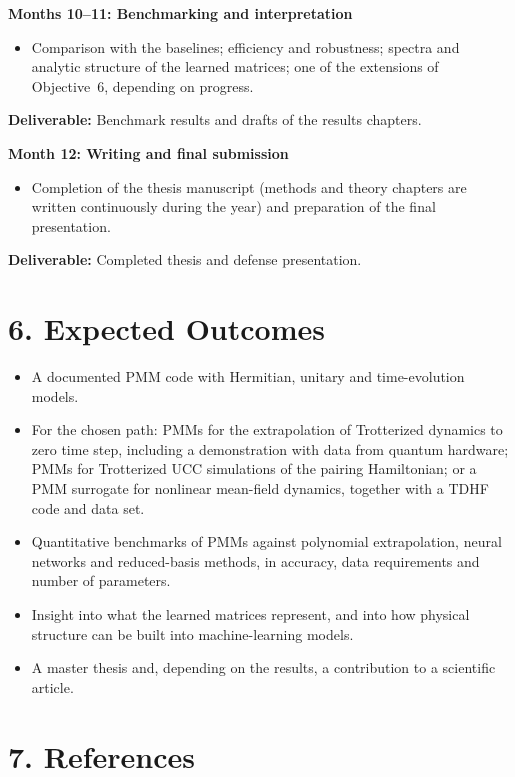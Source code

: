\documentclass[12pt,a4paper]{article}
\begin{document}
\bigskip

\textbf{Months 10--11: Benchmarking and interpretation}
\begin{itemize}
    \item Comparison with the baselines; efficiency and robustness;
    spectra and analytic structure of the learned matrices; one of the
    extensions of Objective~6, depending on progress.
\end{itemize}
\textbf{Deliverable:} Benchmark results and drafts of the results
chapters.

\bigskip

\textbf{Month 12: Writing and final submission}
\begin{itemize}
    \item Completion of the thesis manuscript (methods and theory
    chapters are written continuously during the year) and
    preparation of the final presentation.
\end{itemize}
\textbf{Deliverable:} Completed thesis and defense presentation.

\section*{6. Expected Outcomes}

\begin{itemize}
    \item A documented PMM code with Hermitian, unitary and
    time-evolution models.
    \item For the chosen path: PMMs for the extrapolation of
    Trotterized dynamics to zero time step, including a demonstration
    with data from quantum hardware; PMMs for Trotterized UCC
    simulations of the pairing Hamiltonian; or a PMM surrogate for
    nonlinear mean-field dynamics, together with a TDHF code and data
    set.
    \item Quantitative benchmarks of PMMs against polynomial
    extrapolation, neural networks and reduced-basis methods, in
    accuracy, data requirements and number of parameters.
    \item Insight into what the learned matrices represent, and into
    how physical structure can be built into machine-learning models.
    \item A master thesis and, depending on the results, a
    contribution to a scientific article.
\end{itemize}

\section*{7. References}
\end{document}
